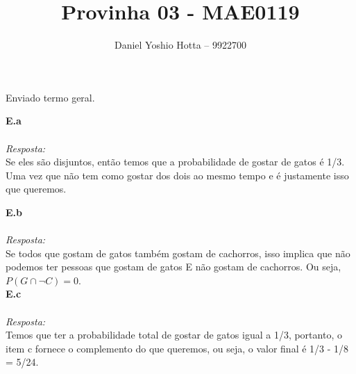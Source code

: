 \documentclass{article}
\begin{document}
	
	\title{Provinha 03 - MAE0119}
	\author{Daniel Yoshio Hotta – 9922700}
	
	\maketitle	
	
		Enviado termo geral.
	
	\textbf {E.a} 
	\\ \\
	\textit {Resposta:} \\
    
    Se eles são disjuntos, então temos que a probabilidade de gostar de gatos é 1/3. Uma vez que não tem como gostar dos dois ao mesmo tempo e é justamente isso que queremos. \\
    
    \maketitle	
    
    \textbf {E.b} 
    \\ \\
    \textit {Resposta:} \\
	
    Se todos que gostam de gatos também gostam de cachorros, isso implica que não podemos ter pessoas que gostam de gatos E não gostam de cachorros. Ou seja, $P(G\cap \neg C) = 0$. \\
    
    \textbf {E.c} 
    \\ \\
    \textit {Resposta:} \\
    
    Temos que ter a probabilidade total de gostar de gatos igual a 1/3, portanto, o item c fornece o complemento do que queremos, ou seja, o valor final é 1/3 - 1/8 = 5/24.
	
\end{document}
